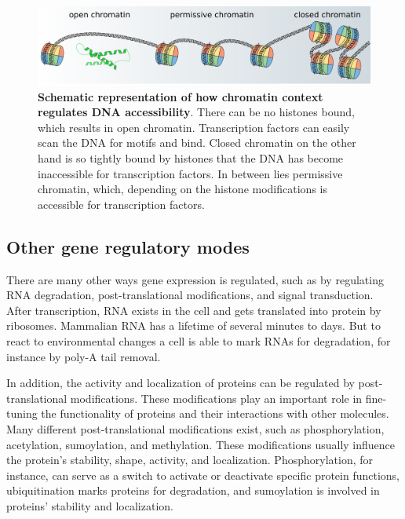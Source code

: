\begin{figure}
    \includegraphics[width=\linewidth]{ch.introduction/imgs/accessibility_horizontal.png}
    \caption{\textbf{Schematic representation of how chromatin context regulates DNA accessibility}. There can be no histones bound, which results in open chromatin. Transcription factors can easily scan the DNA for motifs and bind. Closed chromatin on the other hand is so tightly bound by histones that the DNA has become inaccessible for transcription factors. In between lies permissive chromatin, which, depending on the histone modifications is accessible for transcription factors.}
    \label{fig:accessibility}
\end{figure}

\subsection{Other gene regulatory modes}

There are many other ways gene expression is regulated, such as by regulating RNA degradation, post-translational modifications, and signal transduction. After transcription, RNA exists in the cell and gets translated into protein by ribosomes. Mammalian RNA has a lifetime of several minutes to days\cite{Yu2001}. But to react to environmental changes a cell is able to mark RNAs for degradation, for instance by poly-A tail removal. 

In addition, the activity and localization of proteins can be regulated by post-translational modifications. These modifications play an important role in fine-tuning the functionality of proteins and their interactions with other molecules. Many different post-translational modifications exist, such as phosphorylation, acetylation, sumoylation, and methylation. These modifications usually influence the protein's stability, shape, activity, and localization. Phosphorylation, for instance, can serve as a switch to activate or deactivate specific protein functions, ubiquitination marks proteins for degradation, and sumoylation is involved in proteins' stability and localization\cite{Mazur2012}.

